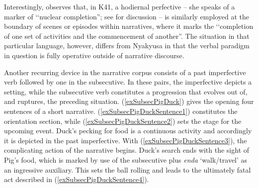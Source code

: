 Interestingly, \citet[143ff]{CraneTM2011} observes that, in  K41, a hodiernal perfective -- she speaks of a marker of \lq\lq nuclear completion''; see  for discussion -- is similarly employed at the boundary of scenes or episodes within narratives, where it marks the \lq\lq completion of one set of activities and the commencement of another''. The situation in that particular language, however, differs from Nyakyusa in that the verbal paradigm in question is fully operative outside of narrative discourse.

Another recurring device in the narrative corpus consists of a past imperfective verb followed by one in the subsecutive. In these pairs, the imperfective depicts a setting, while the subsecutive verb constitutes a progression that evolves out of, and ruptures, the preceding situation. (\ref{exSubsecPigDuck}) gives the opening four sentences of a short narrative. (\ref{exSubsecPigDuckSentence1}) constitutes the orientation section, while (\ref{exSubsecPigDuckSentence2}) sets the stage for the upcoming event. Duck's pecking for food is a continuous activity and accordingly it is depicted in the past imperfective. With (\ref{exSubsecPigDuckSentence3}), the complicating action of the narrative begins. Duck's search ends with the sight of Pig's food, which is marked by use of the subsecutive plus \textit{enda} `walk/travel' as an ingressive auxiliary. This sets the ball rolling and leads to the ultimately fatal act described in (\ref{exSubsecPigDuckSentence4}).

